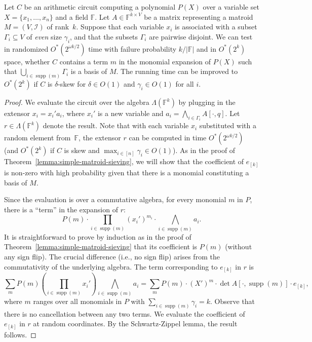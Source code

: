 \documentclass{theoretics}
\newcommand{\F}{\ensuremath{\mathbb F}\xspace}
\newcommand{\cI}{\ensuremath{\mathcal I}\xspace}
\DeclareMathOperator{\supp}{supp}
\begin{document}
\begin{theorem} \label{lemma:extensor-matroid-sieving}
  Let $C$ be an arithmetic circuit computing a polynomial $P(X)$ over a variable set $X = \{ x_1, \dots, x_n \}$ and a field $\F$.
  Let $A \in \F^{k \times V}$ be a matrix representing a matroid $M=(V, \cI)$ of rank~$k$. 
  Suppose that each variable $x_i$ is associated with a subset $\Gamma_i \subseteq V$ of \emph{even} size $\gamma_i$, and that the subsets $\Gamma_i$ are pairwise disjoint.
  We can test in randomized $O^*(2^{\omega k / 2})$ time with failure probability $k / |\F|$ and in $O^*(2^k)$ space, whether $C$ contains a term $m$ in the monomial expansion of $P(X)$ such that $\bigcup_{i \in \supp(m)} \Gamma_i$ is a basis of $M$.
  The running time can be improved to $O^*(2^{k})$ if $C$ is $\delta$-skew for $\delta \in O(1)$ and $\gamma_i \in O(1)$ for all $i$.
\end{theorem}
\begin{proof}
  We evaluate the circuit over the algebra $\Lambda(\F^{k})$ by plugging in the extensor $x_i = x_i' a_i$, where $x_i'$ is a new variable and $a_i = \bigwedge_{i \in \Gamma_i} A[\cdot, q]$. 
  Let $r \in \Lambda(\F^{k})$ denote the result.
  Note that with each variable $x_i$ substituted with a random element from~$\F$, the extensor $r$ can be computed in time $O^*(2^{\omega k /2})$ (and $O^*(2^k)$ if $C$ is skew and $\max_{i \in [n]} \gamma_i \in O(1)$).
  As in the proof of Theorem~\ref{lemma:simple-matroid-sieving}, we will show that the coefficient of $e_{[k]}$ is non-zero with high probability given that there is a monomial constituting a basis of $M$.

  Since the evaluation is over a commutative algebra, for every monomial $m$ in $P$, there is a ``term'' in the expansion of $r$:
  \[
    P(m) \cdot \prod_{i \in \supp(m)} (x_i')^{m_i} \cdot \bigwedge_{i \in \supp(m)} a_i.
  \]
  It is straightforward to prove by induction as in the proof of Theorem~\ref{lemma:simple-matroid-sieving} that its coefficient is $P(m)$ (without any sign flip).
  The crucial difference (i.e., no sign flip) arises from the commutativity of the underlying algebra.
  The term corresponding to $e_{[k]}$ in $r$ is
  \[
    \sum_{m} P(m) \left(\prod_{i \in \supp(m)} x_i'\right) \bigwedge_{i \in \supp(m)} a_i
    = \sum_{m} P(m) \cdot (X')^{m} \cdot \det A[\cdot, \supp(m)] \cdot e_{[k]},
  \]
  where $m$ ranges over all monomials in $P$ with $\sum_{i \in \supp(m)} \gamma_i = k$.
  Observe that there is no cancellation between any two terms.
  We evaluate the coefficient of $e_{[k]}$ in $r$ at random coordinates.
  By the Schwartz-Zippel lemma, the result follows.
\end{proof}
\end{document}
